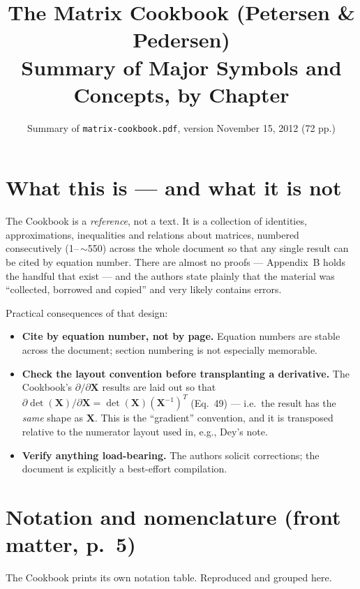 \documentclass[10pt,a4paper]{article}
\title{The Matrix Cookbook (Petersen \& Pedersen)\\[2pt]
       \large Summary of Major Symbols and Concepts, by Chapter}
\author{Summary of \texttt{matrix-cookbook.pdf}, version November 15, 2012 (72 pp.)}
\date{}
\begin{document}
\maketitle
\tableofcontents
\bigskip

\section*{What this is --- and what it is not}

The Cookbook is a \emph{reference}, not a text.  It is a collection of identities,
approximations, inequalities and relations about matrices, numbered
consecutively (1--\,$\sim$550) across the whole document so that any single result
can be cited by equation number.  There are almost no proofs --- Appendix~B holds
the handful that exist --- and the authors state plainly that the material was
``collected, borrowed and copied'' and very likely contains errors.

Practical consequences of that design:

\begin{itemize}
\item \textbf{Cite by equation number, not by page.}  Equation numbers are stable
      across the document; section numbering is not especially memorable.
\item \textbf{Check the layout convention before transplanting a derivative.}  The
      Cookbook's $\partial/\partial\mathbf{X}$ results are laid out so that
      $\partial\det(\mathbf{X})/\partial\mathbf{X}=\det(\mathbf{X})(\mathbf{X}^{-1})^{T}$
      (Eq.~49) --- i.e.\ the result has the \emph{same} shape as $\mathbf{X}$.  This
      is the ``gradient'' convention, and it is transposed relative to the numerator
      layout used in, e.g., Dey's note.
\item \textbf{Verify anything load-bearing.}  The authors solicit corrections; the
      document is explicitly a best-effort compilation.
\end{itemize}

\section{Notation and nomenclature (front matter, p.~5)}

The Cookbook prints its own notation table.  Reproduced and grouped here.
\end{document}
